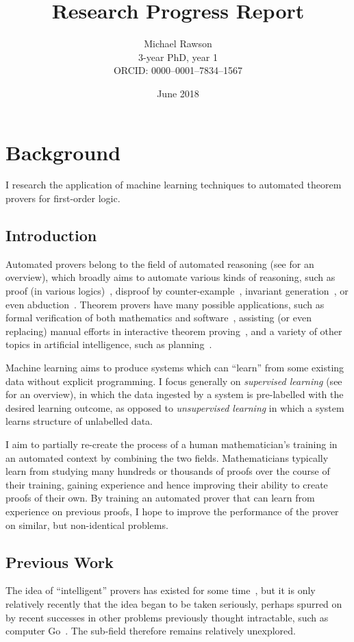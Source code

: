 \documentclass[a4paper, 10pt]{article}
\title{Research Progress Report}
\author{Michael Rawson\\3-year PhD, year 1\\ORCID: 0000--0001--7834--1567}
\date{June 2018}
\begin{document}
\maketitle
\section{Background}
I research the application of machine learning techniques to automated theorem provers for first-order logic.

\subsection{Introduction}
Automated provers belong to the field of automated reasoning (see \cite{survey} for an overview), which broadly aims to automate various kinds of reasoning, such as proof (in various logics)~\cite{LEO, Satallax, Isabelle, E, iProver, Vampire, CVC4, Spass, Z3}, disproof by counter-example~\cite{Nitpick, Refute, MACE}, invariant generation~\cite{invariant}, or even abduction~\cite{science-abduction, abduction}.
Theorem provers have many possible applications, such as formal verification of both mathematics and software~\cite{survey}, assisting (or even replacing) manual efforts in interactive theorem proving~\cite{Isabelle}, and a variety of other topics in artificial intelligence, such as planning~\cite{planning}.

Machine learning aims to produce systems which can ``learn'' from some existing data without explicit programming.
I focus generally on \emph{supervised learning} (see \cite{supervised-learning} for an overview), in which the data ingested by a system is pre-labelled with the desired learning outcome, as opposed to \emph{unsupervised learning} in which a system learns structure of unlabelled data.

I aim to partially re-create the process of a human mathematician's training in an automated context by combining the two fields.
Mathematicians typically learn from studying many hundreds or thousands of proofs over the course of their training, gaining experience and hence improving their ability to create proofs of their own.
By training an automated prover that can learn from experience on previous proofs, I hope to improve the performance of the prover on similar, but non-identical problems.

\subsection{Previous Work}
The idea of ``intelligent'' provers has existed for some time~\cite{survey}, but it is only relatively recently that the idea began to be taken seriously, perhaps spurred on by recent successes in other problems previously thought intractable, such as computer Go~\cite{alphago}.
The sub-field therefore remains relatively unexplored.
\end{document}
